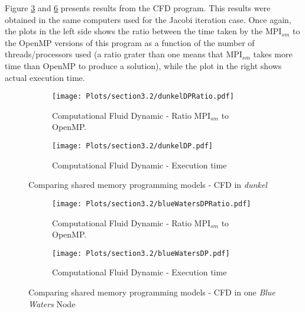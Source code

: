 \medskip

Figure \ref{fig:Figure3} and \ref{fig:Figure4} presents results from the CFD program. This results were obtained in the same computers used for the Jacobi iteration case. Once again, the plots in the left side shows the ratio between the time taken by the MPI$_{sm}$ to the OpenMP versions of this program as a function of the number of threads/processors used (a ratio grater than one means that MPI$_{sm}$ takes more time than OpenMP to produce a solution), while the plot in the right shows actual execution time.



\begin{figure} [h!]
    \centering
    \captionsetup{justification=raggedright, singlelinecheck=false}
    \begin{subfigure}{.6\textwidth}
      \hspace*{-1.5cm} 
      \texttt{[image: Plots/section3.2/dunkelDPRatio.pdf]}
      \caption{Computational Fluid Dynamic - Ratio MPI$_{sm}$ to OpenMP.}
      \label{fig:RatioDunkelCFD}
    \end{subfigure}%
    \begin{subfigure}{.6\textwidth}
      \hspace*{-1.5cm} 
      \texttt{[image: Plots/section3.2/dunkelDP.pdf]}
      \caption{Computational Fluid Dynamic - Execution time}
      \label{fig:TimeDunkelCFD}
    \end{subfigure}
\caption{Comparing shared memory programming models - CFD in \emph{dunkel}}
\label{fig:Figure3}
\end{figure}

\medskip


\begin{figure} [h!]
    \centering
    \captionsetup{justification=raggedright, singlelinecheck=false}
    \begin{subfigure}{.6\textwidth}
      \hspace*{-1.5cm} 
      \texttt{[image: Plots/section3.2/blueWatersDPRatio.pdf]}
      \caption{Computational Fluid Dynamic - Ratio MPI$_{sm}$ to OpenMP.}
      \label{fig:RatioBWCFD}
    \end{subfigure}%
    \begin{subfigure}{.6\textwidth}
      \hspace*{-1.5cm} 
      \texttt{[image: Plots/section3.2/blueWatersDP.pdf]}
      \caption{Computational Fluid Dynamic - Execution time}
      \label{fig:TimeBWCFD}
    \end{subfigure}
\caption{Comparing shared memory programming models - CFD in one \emph{Blue Waters} Node}
\label{fig:Figure4}
\end{figure}



